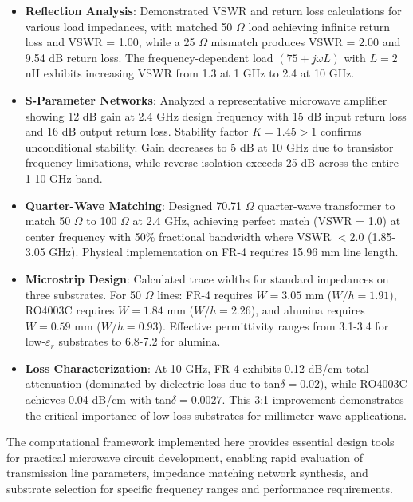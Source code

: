 \documentclass[11pt,a4paper]{article}
\begin{document}
\begin{itemize}
\item \textbf{Reflection Analysis}: Demonstrated VSWR and return loss calculations for various load impedances, with matched 50 $\Omega$ load achieving infinite return loss and VSWR = 1.00, while a 25 $\Omega$ mismatch produces VSWR = 2.00 and 9.54 dB return loss. The frequency-dependent load $(75 + j\omega L)$ with $L = 2$ nH exhibits increasing VSWR from 1.3 at 1 GHz to 2.4 at 10 GHz.

\item \textbf{S-Parameter Networks}: Analyzed a representative microwave amplifier showing 12 dB gain at 2.4 GHz design frequency with 15 dB input return loss and 16 dB output return loss. Stability factor $K = 1.45 > 1$ confirms unconditional stability. Gain decreases to 5 dB at 10 GHz due to transistor frequency limitations, while reverse isolation exceeds 25 dB across the entire 1-10 GHz band.

\item \textbf{Quarter-Wave Matching}: Designed 70.71 $\Omega$ quarter-wave transformer to match 50 $\Omega$ to 100 $\Omega$ at 2.4 GHz, achieving perfect match (VSWR = 1.0) at center frequency with 50\% fractional bandwidth where VSWR $< 2.0$ (1.85-3.05 GHz). Physical implementation on FR-4 requires 15.96 mm line length.

\item \textbf{Microstrip Design}: Calculated trace widths for standard impedances on three substrates. For 50 $\Omega$ lines: FR-4 requires $W = 3.05$ mm ($W/h = 1.91$), RO4003C requires $W = 1.84$ mm ($W/h = 2.26$), and alumina requires $W = 0.59$ mm ($W/h = 0.93$). Effective permittivity ranges from 3.1-3.4 for low-$\varepsilon_r$ substrates to 6.8-7.2 for alumina.

\item \textbf{Loss Characterization}: At 10 GHz, FR-4 exhibits 0.12 dB/cm total attenuation (dominated by dielectric loss due to tan$\delta = 0.02$), while RO4003C achieves 0.04 dB/cm with tan$\delta = 0.0027$. This 3:1 improvement demonstrates the critical importance of low-loss substrates for millimeter-wave applications.
\end{itemize}

The computational framework implemented here provides essential design tools for practical microwave circuit development, enabling rapid evaluation of transmission line parameters, impedance matching network synthesis, and substrate selection for specific frequency ranges and performance requirements.
\end{document}
